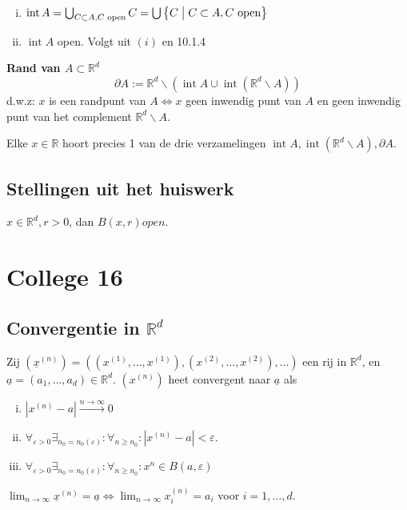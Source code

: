\documentclass[a4paper]{exam}
\theoremstyle{definition}
\DeclareMathOperator{\intr}{int}
\begin{document}
        \theorem
          \begin{enumerate}[(i)]
            \item $\intr A=\bigcup_{C \subset A, C \text{ open} }C=\bigcup \big\{C \bigm| C \subset A, C \text{ open} \big\}$
            \item $\intr A$ open. Volgt uit $(i)$ en 10.1.4
          \end{enumerate}

         \textbf{Rand van $A \subset \mathbb{R}^d$}
            \[\partial A:= \mathbb{R}^d\backslash (\intr A \cup \intr (\mathbb{R}^d\backslash A))\]
              d.w.z: $x$ is een randpunt van $A \Leftrightarrow x$ geen inwendig punt van $A$ en geen inwendig punt van het complement $\mathbb{R}^d\backslash A$.

        \lemma
        	Elke $x \in \mathbb{R}$ hoort precies 1 van de drie verzamelingen $\intr A, \intr (\mathbb{R}^d\backslash A), \partial A$.

  	\subsection{Stellingen uit het huiswerk}
        \theorem $x \in \mathbb{R}^d, r>0$, dan $B(x,r) open$.
\newpage
\section{College 16}
	\subsection{Convergentie in $\mathbb{R}^d$}
		 Zij $(\underline{x}^{(n)}) = ((x^{(1)},\dots ,x^{(1)}),(x^{(2)},\dots ,x^{(2)}),\dots )$ een rij in $\mathbb{R}^d$, en $\underline{a}=(a_1, \dots ,a_d ) \in \mathbb{R}^d$. $(x^{(n)}) $ heet convergent naar $\underline{a}$ als
			\begin{enumerate}[(i)]
				\item $|x^{(n)}-a|\stackrel{n\rightarrow \infty}{\longrightarrow} 0$
				\item $\forall _{\varepsilon >0} \exists _{n_0=n_0(\varepsilon)}: \forall _{n\geq n_0} : |x^{(n)} - a| < \varepsilon$.
				\item $\forall _{\varepsilon >0} \exists _{n_0=n_0(\varepsilon)}: \forall _{n\geq n_0} : x^n \in B(a,\varepsilon )$
			\end{enumerate}
		
		\theorem $\lim_{n\rightarrow\infty}\underline{x}^{(n)}=\underline{a} \Leftrightarrow \lim_{n\rightarrow\infty} x_{i}^{(n)} = a_i$ voor $i=1,\dots ,d$.
		
\end{document}
